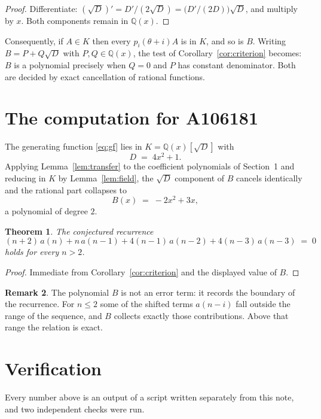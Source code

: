\documentclass[11pt,a4paper]{article}
\theoremstyle{plain}
\newtheorem{theorem}{Theorem}
\theoremstyle{definition}
\newtheorem{remark}[theorem]{Remark}
\begin{document}
\begin{proof}
Differentiate: $(\sqrt{D})'=D'/(2\sqrt{D})=\bigl(D'/(2D)\bigr)\sqrt{D}$, and multiply by
$x$. Both components remain in $\mathbb{Q}(x)$.
\end{proof}

Consequently, if $A\in K$ then every $p_{i}(\theta+i)A$ is in $K$, and so is $B$. Writing
$B=P+Q\sqrt{D}$ with $P,Q\in\mathbb{Q}(x)$, the test of Corollary~\ref{cor:criterion}
becomes: $B$ is a polynomial precisely when $Q=0$ and $P$ has constant denominator. Both
are decided by exact cancellation of rational functions.

\section{The computation for A106181}

The generating function \eqref{eq:gf} lies in $K=\mathbb{Q}(x)[\sqrt{D}]$ with
\[
D \;=\; 4 x^{2} + 1 .
\]
Applying Lemma~\ref{lem:transfer} to the coefficient polynomials of Section~1 and reducing
in $K$ by Lemma~\ref{lem:field}, the $\sqrt{D}$ component of $B$ cancels identically and
the rational part collapses to
\[
B(x)\;=\;- 2 x^{2} + 3 x ,
\]
a polynomial of degree $2$.

\begin{theorem}
The conjectured recurrence
\[
(n + 2)\,a(n) + n\,a(n-1) + 4 \left(n - 1\right)\,a(n-2) + 4 \left(n - 3\right)\,a(n-3) \;=\;0
\]
holds for every $n>2$.
\end{theorem}

\begin{proof}
Immediate from Corollary~\ref{cor:criterion} and the displayed value of $B$.
\end{proof}

\begin{remark}
The polynomial $B$ is not an error term: it records the boundary of the recurrence. For
$n\le2$ some of the shifted terms $a(n-i)$ fall outside the range of the sequence,
and $B$ collects exactly those contributions. Above that range the relation is exact.
\end{remark}

\section{Verification}

Every number above is an output of a script written separately from this note, and two
independent checks were run.
\end{document}
